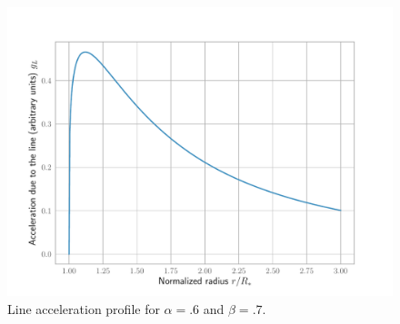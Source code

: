 \documentclass[main.tex]{subfiles}
\begin{document}
\begin{figure}[H]
\centering
\includegraphics[width=\textwidth]{figures/line_acceleration_profile.pdf}
\caption{Line acceleration profile for \(\alpha = \num{.6}\) and \(\beta = \num{.7}\).}
\label{fig:line_acceleration_profile}
\end{figure}
\end{document}
